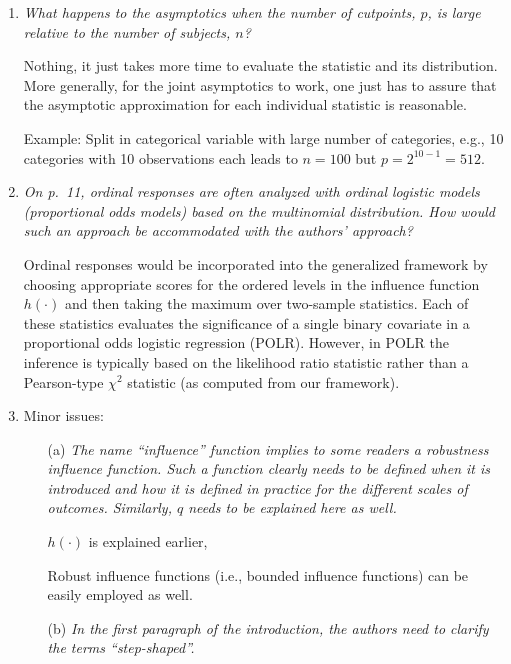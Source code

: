\documentclass[11pt,a4paper]{article}
\begin{document}
\begin{enumerate}
  \item \textit{What happens to the asymptotics when the number of cutpoints, $p$,
        is large relative to the number of subjects, $n$?}
	
	Nothing, it just takes more time to evaluate the statistic and its distribution.	
        More generally, for the joint asymptotics to work, one just has to assure that the
	asymptotic approximation for each individual statistic is reasonable.

	Example: Split in categorical variable with large number of categories, e.g.,
	10 categories with 10 observations each leads to $n = 100$ but
	$p = 2^{10 - 1} = 512$.
	
  \item \textit{On p.~11, ordinal responses are often analyzed with ordinal
        logistic models (proportional odds models) based on the multinomial
	distribution. How would such an approach be accommodated with the
	authors' approach?}
	
	Ordinal responses would be incorporated into the generalized framework
	by choosing appropriate scores for the ordered levels in the influence
	function $h(\cdot)$ and then taking the maximum over two-sample statistics.
	Each of these statistics evaluates the significance of a single binary
	covariate in a proportional odds logistic regression (POLR). However, in
	POLR the inference is typically based on the likelihood ratio statistic
	rather than a Pearson-type $\chi^2$ statistic (as computed from our
	framework).
	
  \item Minor issues:
  
  \begin{itemize}
  
    \item[(a)] \textit{The name ``influence'' function implies to some readers a
               robustness influence function. Such a function clearly needs to be
	       defined when it is introduced and how it is defined in practice
	       for the different scales of outcomes. Similarly, $q$ needs to be
	       explained here as well.}
	       
	       $h(\cdot)$ is explained earlier, 
	       
	       Robust influence functions (i.e., bounded influence functions) can
	       be easily employed as well.
	       
    \item[(b)] \textit{In the first paragraph of the introduction, the authors need to
               clarify the terms ``step-shaped''.}
	       

\end{itemize}
\end{enumerate}
\end{document}
